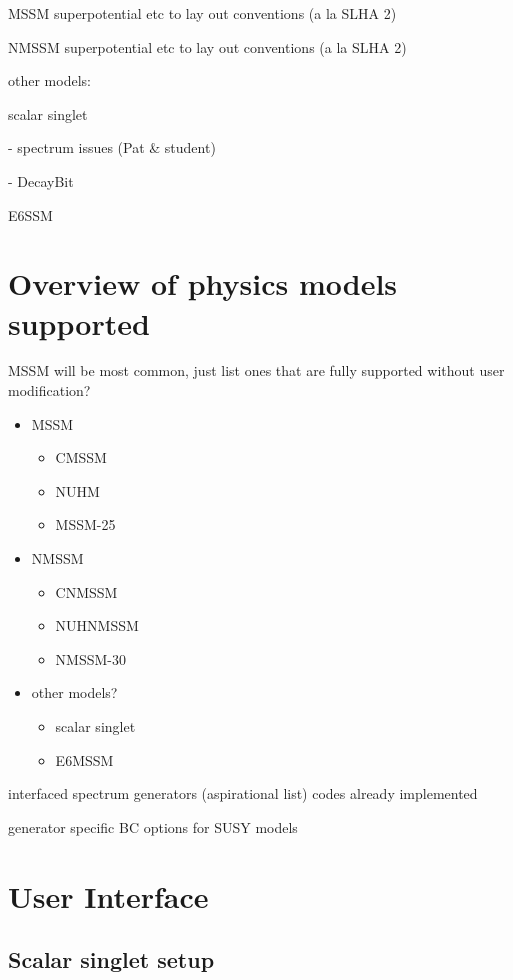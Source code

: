 \documentclass[11pt,a4paper]{article}
\begin{document}
MSSM superpotential etc to lay out conventions (a la SLHA 2)

NMSSM superpotential etc to lay out conventions (a la SLHA 2)

other models:

scalar singlet

 - spectrum issues (Pat \& student)

 - DecayBit

E6SSM

\section{Overview of physics models supported}

MSSM will be most common, just list ones that are fully supported without user modification?

\begin{itemize} 
\item MSSM
  \begin{itemize}
  \item CMSSM 
  \item NUHM 
  \item MSSM-25
  \end{itemize} 
\item NMSSM
  \begin{itemize}
  \item CNMSSM  
  \item NUHNMSSM 
  \item NMSSM-30
  \end{itemize}
\item other models?
  \begin{itemize}
  \item scalar singlet
  \item E6MSSM  
  \end{itemize}
\end{itemize}  

interfaced spectrum generators (aspirational list)
codes already implemented
         
generator specific BC options for SUSY models

\section{User Interface}

\subsection{Scalar singlet setup} 
\end{document}
